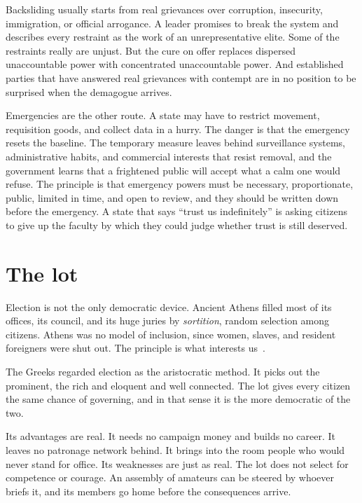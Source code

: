 \documentclass[12pt,a4paper]{book}
\begin{document}
Backsliding usually starts from real grievances over corruption, insecurity, immigration, or official arrogance. A leader promises to break the system and describes every restraint as the work of an unrepresentative elite. Some of the restraints really are unjust. But the cure on offer replaces dispersed unaccountable power with concentrated unaccountable power. And established parties that have answered real grievances with contempt are in no position to be surprised when the demagogue arrives.

Emergencies are the other route. A state may have to restrict movement, requisition goods, and collect data in a hurry. The danger is that the emergency resets the baseline. The temporary measure leaves behind surveillance systems, administrative habits, and commercial interests that resist removal, and the government learns that a frightened public will accept what a calm one would refuse. The principle is that emergency powers must be necessary, proportionate, public, limited in time, and open to review, and they should be written down before the emergency. A state that says ``trust us indefinitely'' is asking citizens to give up the faculty by which they could judge whether trust is still deserved.

\section{The lot}

Election is not the only democratic device. Ancient Athens filled most of its offices, its council, and its huge juries by \emph{sortition}, random selection among citizens. Athens was no model of inclusion, since women, slaves, and resident foreigners were shut out. The principle is what interests us~\cite{dow_aristotlekleroteria_1939}.

The Greeks regarded election as the aristocratic method. It picks out the prominent, the rich and eloquent and well connected. The lot gives every citizen the same chance of governing, and in that sense it is the more democratic of the two.

Its advantages are real. It needs no campaign money and builds no career. It leaves no patronage network behind. It brings into the room people who would never stand for office. Its weaknesses are just as real. The lot does not select for competence or courage. An assembly of amateurs can be steered by whoever briefs it, and its members go home before the consequences arrive.
\end{document}
